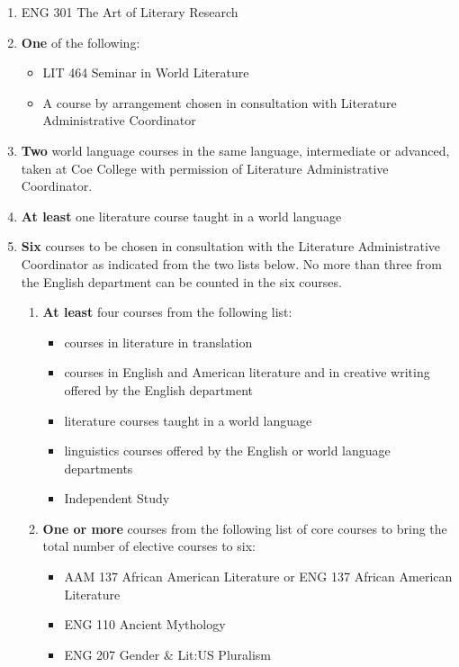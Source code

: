 \documentclass[
  letterpaper,
]{scrbook}
\providecommand{\tightlist}{%
  \setlength{\itemsep}{0pt}\setlength{\parskip}{0pt}}
\begin{document}
\begin{enumerate}
\def\labelenumi{\arabic{enumi}.}
\item
  ENG 301 The Art of Literary Research
\item
  \textbf{One} of the following:

  \begin{itemize}
  \tightlist
  \item
    LIT 464 Seminar in World Literature
  \item
    A course by arrangement chosen in consultation with Literature
    Administrative Coordinator
  \end{itemize}
\item
  \textbf{Two} world language courses in the same language, intermediate
  or advanced, taken at Coe College with permission of Literature
  Administrative Coordinator.\\
\item
  \textbf{At least} one literature course taught in a world language
\item
  \textbf{Six} courses to be chosen in consultation with the Literature
  Administrative Coordinator as indicated from the two lists below. No
  more than three from the English department can be counted in the six
  courses.

  \begin{enumerate}
  \def\labelenumii{\alph{enumii})}
  \tightlist
  \item
    \textbf{At least} four courses from the following list:

    \begin{itemize}
    \tightlist
    \item
      courses in literature in translation
    \item
      courses in English and American literature and in creative writing
      offered by the English department
    \item
      literature courses taught in a world language
    \item
      linguistics courses offered by the English or world language
      departments
    \item
      Independent Study
    \end{itemize}
  \item
    \textbf{One or more} courses from the following list of core courses
    to bring the total number of elective courses to six:

    \begin{itemize}
    \tightlist
    \item
      AAM 137 African American Literature or ENG 137 African American
      Literature
    \item
      ENG 110 Ancient Mythology
    \item
      ENG 207 Gender \& Lit:US Pluralism
    \end{itemize}
  \end{enumerate}
\end{enumerate}
\end{document}
